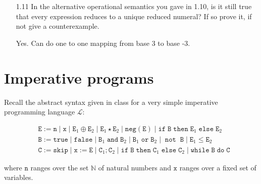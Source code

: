 \documentclass[a4paper,10pt]{article}
\newcommand{\E}{\mathtt{E}}
\newcommand{\B}{\mathtt{B}}
\newcommand{\C}{\mathtt{C}}
\newcommand{\true}{\mathtt{true}}
\newcommand{\false}{\mathtt{false}}
\newcommand{\andsym}{\mathtt{and}}
\newcommand{\orsym}{\mathtt{or}}
\newcommand{\notsym}{\mathop{\mathtt{not}}}
\newcommand{\ifsym}{\mathtt{if}}
\newcommand{\then}{\mathtt{then}}
\newcommand{\elsesym}{\mathtt{else}}
\newcommand{\whilesym}{\mathtt{while}}
\newcommand{\dosym}{\mathtt{do}}
\newcommand{\skipsym}{\mathtt{skip}}
\newcommand{\negation}{\mathtt{neg}}
\newcommand{\denot}[1]{\mathtt{[[{#1}]]}}
\newcommand{\question}[1]
{\color{DarkBlue}#1 \color{Black} \newline}
\begin{document}
\begin{enumerate}
{What is the range of this semantic function? Why? Define an operational semantics for 
ternary functions which is correct with respect to the above denotational semantics.
}

The range of this semantic function is $\mathbb{Z}$, i.e.
$$\denot{\cdot}_a : \textbf{Exp} \rightarrow \mathbb{Z}$$

This is because for every integer i in $\mathbb{Z}$, there exists an expression
$\E \in \textbf{Exp}$ such that $\denot{\E} = i$. 

Induction.

\question{
\item[1.11] In the alternative operational semantics you gave in 1.10, is it still true that every expression reduces to a 
unique reduced numeral? If so prove it, if not give a counterexample. 
}

Yes. Can do one to one mapping from base 3 to base -3.

\end{enumerate}



\section{Imperative programs}

\question{
Recall the abstract syntax given in class for a very simple imperative programming language $\mathcal{L}$:

\begin{align*}
& \E := \mathtt{n} \; | \; \mathtt{x} \; | \; \E_1 \oplus \E_2 \; | \; \E_1 \star \E_2 \; | \; \negation(\E) \; | \; \ifsym \; \B \; \then \; \E_1 \; \elsesym \; \E_2 \\ 
& \B := \true \; | \; \false \; | \; \B_1 \; \andsym \; \B_2 \; | \; \B_1 \; \orsym \; \B_2 \; | \; \notsym \; \B \; | \; \E_1 \leq \E_2 \\
& \C := \skipsym \; | \; \mathtt{x} := \E \; | \; \C_1 ; \C_2 \; | \; \ifsym \; \B \; \then \; \C_1 \; \elsesym \; \C_2 \; | \; \whilesym \; \B \; \dosym \; \C
\end{align*}

where $\mathtt{n}$ ranges over the set $\mathbb{N}$ of natural numbers and $\mathtt{x}$ 
ranges over a fixed set of variables.
}
\end{document}
